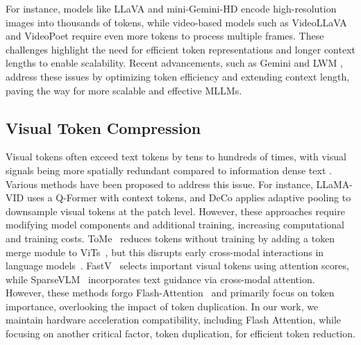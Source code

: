For instance, models like LLaVA \citep{liu2023improvedllava} and mini-Gemini-HD \citep{li2024mini} encode high-resolution images into thousands of tokens, while video-based models such as VideoLLaVA \citep{lin2023video} and VideoPoet \citep{kondratyuk2023videopoet} require even more tokens to process multiple frames. These challenges highlight the need for efficient token representations and longer context lengths to enable scalability. Recent advancements, such as Gemini \citep{geminiteam2023gemini} and LWM \citep{liu2024world}, address these issues by optimizing token efficiency and extending context length, paving the way for more scalable and effective MLLMs.

\vspace{-1mm}
\subsection{Visual Token Compression}
Visual tokens often exceed text tokens by tens to hundreds of times, with visual signals being more spatially redundant compared to information dense text \citep{marr2010vision}. 
Various methods have been proposed to address this issue. For instance, LLaMA-VID \citep{li2023llama} uses a Q-Former with context tokens, and DeCo \citep{yao2024deco} applies adaptive pooling to downsample visual tokens at the patch level.
However, these approaches require modifying model components and additional training, increasing computational and training costs.
ToMe~\citep{bolya2022tome} reduces tokens without training by adding a token merge module to ViTs~\citep{alexey2020image}, but this disrupts early cross-modal interactions in language models~\citep{xing2024PyramidDrop}. FastV~\citep{chen2024image} selects important visual tokens using attention scores, while SparseVLM~\citep{zhang2024sparsevlm} incorporates text guidance via cross-modal attention. 
However, these methods forgo Flash-Attention~\citep{dao2022flashattention, dao2023flashattention2} and primarily focus on token importance, overlooking the impact of token duplication.
In our work, we maintain hardware acceleration compatibility, including Flash Attention, while focusing on another critical factor, token duplication, for efficient token reduction.

